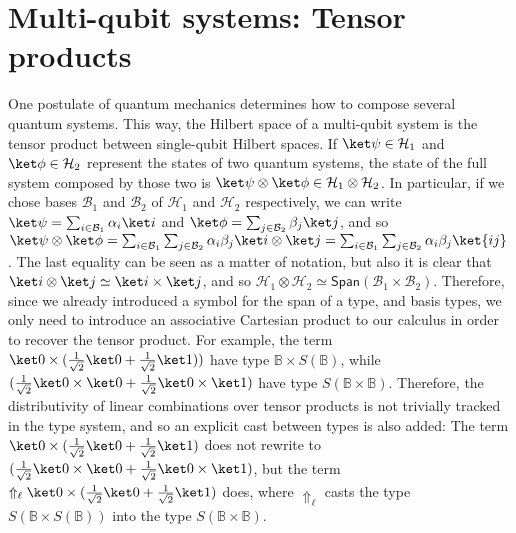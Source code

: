 \documentclass[preprint]{elsarticle}
\newcommand\Span{\ensuremath{\mathsf{Span}}}
\newcommand\B{\ensuremath{\mathbb B}}
\newcommand\pair[2]{({#1}+{#2})}
\begin{document}
\section{Multi-qubit systems: Tensor products}\label{sec:tensor}
\label{sec:TRS}

One postulate of quantum mechanics determines how to compose several quantum
systems. This way, the Hilbert space of a multi-qubit system is the tensor
product between single-qubit Hilbert spaces. If $\ket\psi\in\mathcal H_1$ and
$\ket\phi\in\mathcal H_2$ represent the states of two quantum systems, the state
of the full system composed by those two is $\ket\psi\otimes\ket\phi\in\mathcal
H_1\otimes\mathcal H_2$. In particular, if we chose bases $\mathcal B_1$ and
$\mathcal B_2$ of $\mathcal H_1$ and $\mathcal H_2$ respectively, we can write
$\ket\psi=\sum_{i\in\mathcal B_1}\alpha_i\ket i$ and
$\ket\phi=\sum_{j\in\mathcal B_2}\beta_j\ket j$, and so
$\ket\psi\otimes\ket\phi=\sum_{i\in\mathcal B_1}\sum_{j\in\mathcal
  B_2}\alpha_i\beta_j\ket i\otimes\ket j=\sum_{i\in\mathcal
  B_1}\sum_{j\in\mathcal B_2}\alpha_i\beta_j\ket{ij}$. The last equality can be
seen as a matter of notation, but also it is clear that $\ket i\otimes\ket
j\simeq\ket i\times\ket j$, and so $\mathcal H_1\otimes\mathcal H_2\simeq
\Span(\mathcal B_1\times\mathcal B_2)$. Therefore, since we already introduced a
symbol for the span of a type, and basis types, we only need to introduce an associative
Cartesian product to our calculus in order to recover the tensor product. For
example, the term $\ket 0\times\pair{\frac 1{\sqrt 2}\ket 0}{\frac 1{\sqrt
    2}\ket 1})$ have type $\B\times S(\B)$, while $\pair{\frac 1{\sqrt 2}\ket
  0\times\ket 0}{\frac 1{\sqrt 2}\ket 0\times\ket 1}$ have type $S(\B\times\B)$.
Therefore, the distributivity of linear combinations over tensor products is not
trivially tracked in the type system, and so an explicit cast between types is
also added: The term $\ket 0\times\pair{\frac 1{\sqrt 2}\ket 0}{\frac 1{\sqrt
    2}\ket 1}$ does not rewrite to $\pair{\frac 1{\sqrt 2}\ket 0\times\ket
  0}{\frac 1{\sqrt 2}\ket 0\times\ket 1}$, but the term $\Uparrow_\ell\ket 0\times\pair{\frac 1{\sqrt 2}\ket 0}{\frac 1{\sqrt
    2}\ket 1}$ does, where $\Uparrow_\ell$ casts the type $S(\B\times S(\B))$ into the type $S(\B\times\B)$.
\end{document}
